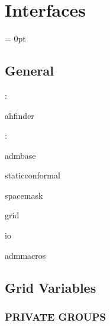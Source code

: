 
\section{Interfaces} 


\parskip = 0pt

\vspace{3mm} \subsection*{General}

: 

ahfinder
\vspace{2mm}

: 

admbase

staticconformal

spacemask

grid

io

admmacros
\vspace{2mm}
\subsection*{Grid Variables}
\vspace{5mm}\subsubsection{PRIVATE GROUPS}

\vspace{5mm}

